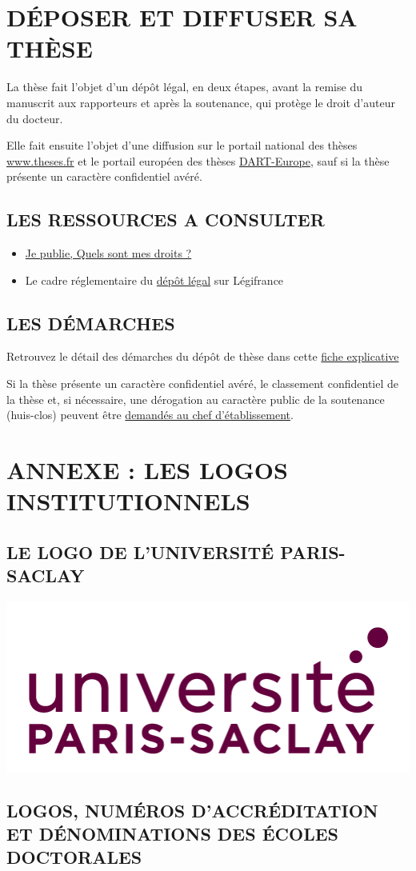 \documentclass[main=french,a4paper]{book}
\begin{document}
\chapter{DÉPOSER ET DIFFUSER SA THÈSE}
La thèse fait l’objet d’un dépôt légal, en deux étapes, avant la remise du manuscrit aux rapporteurs et après la soutenance, qui protège le droit d’auteur du docteur.\\ \par 
Elle fait ensuite l’objet d’une diffusion sur le portail national des thèses \url{www.theses.fr} et le portail européen des thèses \href{https://www.dart-europe.org/basic-search.php}{DART-Europe}, sauf si la thèse présente un caractère confidentiel avéré.
\section{LES RESSOURCES A CONSULTER}

\begin{itemize}
\renewcommand{\labelitemi}{$\bullet$}
\item \href{http://corist-shs.cnrs.fr/sites/default/files/ressources/droit_auteur_lecture_vf.pdf}{Je publie, Quels sont mes droits ?}
\item Le cadre réglementaire du \href{https://www.legifrance.gouv.fr/codes/article_lc/LEGIARTI000006845515/}{dépôt légal} sur Légifrance
\end{itemize}

\section{LES DÉMARCHES}
Retrouvez le détail des démarches du dépôt de thèse dans cette \href{https://www.universite-paris-saclay.fr/sites/default/files/2021-12/fiche-depot-legal-these-2021_0.pdf}{fiche explicative}\\ \par
Si la thèse présente un caractère confidentiel avéré, le classement confidentiel de la thèse et, si nécessaire, une dérogation au caractère public de la soutenance (huis-clos) peuvent être \href{https://www.universite-paris-saclay.fr/research/doctorate/quality-assurance-documents/documents-de-reference-relatifs-la-soutenance-de-la-these}{demandés au chef d’établissement}.


\chapter{ANNEXE : LES LOGOS INSTITUTIONNELS}
\section{LE LOGO DE L’UNIVERSITÉ PARIS-SACLAY}
\noindent \includegraphics[scale=0.4]{photo_logo/Logo_ups.png}
\section{LOGOS, NUMÉROS D’ACCRÉDITATION ET DÉNOMINATIONS DES ÉCOLES DOCTORALES}
\end{document}

